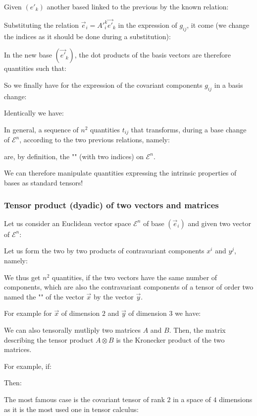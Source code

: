 	Given $({e'}_k)$ another based linked to the previous by the known relation:
	
	Substituting the relation $\vec{e}_i={A'}_i^k\vec{e'}_k$ in the expression of $g_{ij}$, it come (we change the indices as it should be done during a substitution):
	
	In the new base $(\vec{e'}_k)$, the dot products of the basis vectors are therefore quantities such that:
	
	So we finally have for the expression of the covariant components $g_{ij}$ in a basis change:
	
	Identically we have:
	
	In general, a sequence of $n^2$ quantities $t_{ij}$ that transforms, during a base change of $\mathcal{E}^n$, according to the two previous relations, namely:
	
	are, by definition, the "" (with two indices) on $\mathcal{E}^n$.

	We can therefore manipulate quantities expressing the intrinsic properties of bases as standard tensors!
	
	\subsubsection{Tensor product (dyadic) of two vectors and matrices}
	Let us consider an Euclidean vector space $\mathcal{E}^n$ of base $(\vec{e}_i)$ and given two vector of $\mathcal{E}^n$:
	
	Let us form the two by two products of contravariant components $x^i$ and $y^j$, namely:
	
	We thus get $n^2$ quantities, if the two vectors have the same number of components, which are also the contravariant components of a tensor of order two named the "" of the vector $\vec{x}$ by the vector $\vec{y}$.
	
	For example for $\vec{x}$ of dimension $2$ and $\vec{y}$ of dimension $3$ we have:
	
	We can also tensorally mutliply two matrices $A$ and $B$. Then, the matrix describing the tensor product $A\otimes B$ is the Kronecker product of the two matrices.
	
	For example, if:
	
	Then:
	
	The most famous case is the covariant tensor of rank $2$ in a space of $4$ dimensions as it is the most used one in tensor calculus:
	
